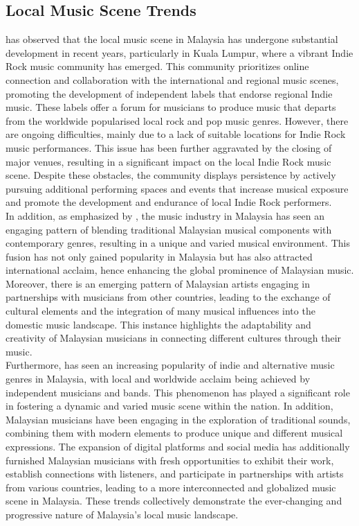 \subsection{Local Music Scene Trends}
\textcite{ong19} has observed that the local music scene in Malaysia has undergone substantial development in recent years, particularly in Kuala Lumpur, where a vibrant Indie Rock music community has emerged. This community prioritizes online connection and collaboration with the international and regional music scenes, promoting the development of independent labels that endorse regional Indie music. These labels offer a forum for musicians to produce music that departs from the worldwide popularised local rock and pop music genres. However, there are ongoing difficulties, mainly due to a lack of suitable locations for Indie Rock music performances. This issue has been further aggravated by the closing of major venues, resulting in a significant impact on the local Indie Rock music scene. Despite these obstacles, the community displays persistence by actively pursuing additional performing spaces and events that increase musical exposure and promote the development and endurance of local Indie Rock performers. \\

In addition, as emphasized by \textcite{mohd21}, the music industry in Malaysia has seen an engaging pattern of blending traditional Malaysian musical components with contemporary genres, resulting in a unique and varied musical environment. This fusion has not only gained popularity in Malaysia but has also attracted international acclaim, hence enhancing the global prominence of Malaysian music. Moreover, there is an emerging pattern of Malaysian artists engaging in partnerships with musicians from other countries, leading to the exchange of cultural elements and the integration of many musical influences into the domestic music landscape. This instance highlights the adaptability and creativity of Malaysian musicians in connecting different cultures through their music. \\

Furthermore, \textcite{silahudin19} has seen an increasing popularity of indie and alternative music genres in Malaysia, with local and worldwide acclaim being achieved by independent musicians and bands. This phenomenon has played a significant role in fostering a dynamic and varied music scene within the nation. In addition, Malaysian musicians have been engaging in the exploration of traditional sounds, combining them with modern elements to produce unique and different musical expressions. The expansion of digital platforms and social media has additionally furnished Malaysian musicians with fresh opportunities to exhibit their work, establish connections with listeners, and participate in partnerships with artists from various countries, leading to a more interconnected and globalized music scene in Malaysia. These trends collectively demonstrate the ever-changing and progressive nature of Malaysia's local music landscape. \pagebreak

